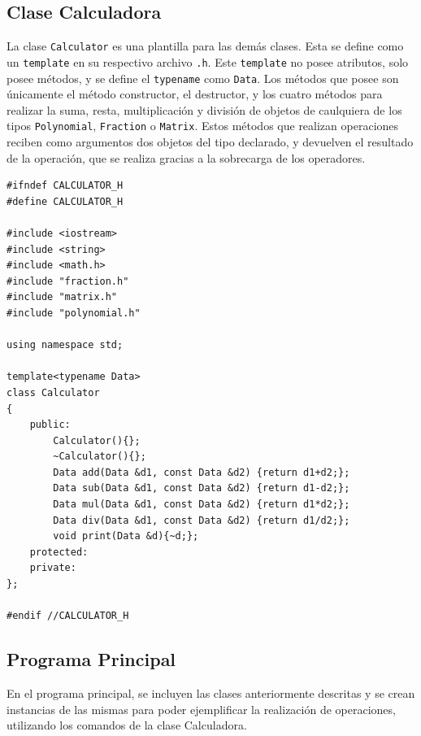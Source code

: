 \subsection{Clase Calculadora}

La clase \texttt{Calculator} es una plantilla para las demás clases. Esta se define como un \texttt{template} en su respectivo archivo \texttt{.h}. Este \texttt{template} no posee atributos, solo posee métodos, y se define el \texttt{typename} como \texttt{Data}. Los métodos que posee son únicamente el método constructor, el destructor, y los cuatro métodos para realizar la suma, resta, multiplicación y división de objetos de caulquiera de los tipos \texttt{Polynomial}, \texttt{Fraction} o \texttt{Matrix}. Estos métodos que realizan operaciones reciben como argumentos dos objetos del tipo declarado, y devuelven el resultado de la operación, que se realiza gracias a la sobrecarga de los operadores.

\begin{verbatim}
#ifndef CALCULATOR_H
#define CALCULATOR_H

#include <iostream>
#include <string>
#include <math.h>
#include "fraction.h"
#include "matrix.h"
#include "polynomial.h"

using namespace std;

template<typename Data>
class Calculator
{
	public:
		Calculator(){};
		~Calculator(){};
		Data add(Data &d1, const Data &d2) {return d1+d2;};
		Data sub(Data &d1, const Data &d2) {return d1-d2;};
		Data mul(Data &d1, const Data &d2) {return d1*d2;};
		Data div(Data &d1, const Data &d2) {return d1/d2;};
		void print(Data &d){~d;};
	protected:
	private:
};

#endif //CALCULATOR_H
\end{verbatim}


\subsection{Programa Principal}

En el programa principal, se incluyen las clases anteriormente descritas y se crean instancias de las mismas para poder ejemplificar la realización de operaciones, utilizando los comandos de la clase Calculadora.

